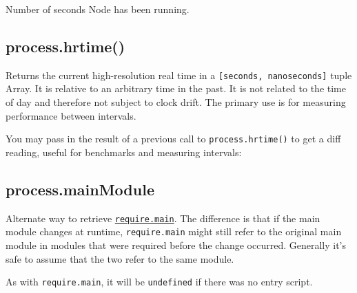 Number of seconds Node has been running.

\subsection{process.hrtime()}\label{process.hrtime}

Returns the current high-resolution real time in a
\texttt{{[}seconds,\ nanoseconds{]}} tuple Array. It is relative to an
arbitrary time in the past. It is not related to the time of day and
therefore not subject to clock drift. The primary use is for measuring
performance between intervals.

You may pass in the result of a previous call to
\texttt{process.hrtime()} to get a diff reading, useful for benchmarks
and measuring intervals:

\begin{Shaded}
\end{Shaded}

\subsection{process.mainModule}\label{process.mainmodule}

Alternate way to retrieve
\href{modules.html\#modules_accessing_the_main_module}{\texttt{require.main}}.
The difference is that if the main module changes at runtime,
\texttt{require.main} might still refer to the original main module in
modules that were required before the change occurred. Generally it's
safe to assume that the two refer to the same module.

As with \texttt{require.main}, it will be \texttt{undefined} if there
was no entry script.
